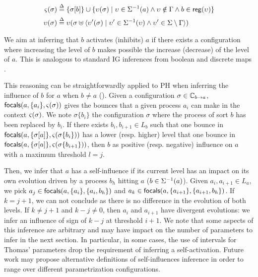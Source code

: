 \begin{align}
\varsigma(\sigma) & \stackrel{\Delta}= \{ \sigma[b] \} \cup \{ \upsilon(\sigma) \mid
\upsilon\in\Sigma^{-1}(a) \wedge  \upsilon \notin\Gamma \wedge b\in \mathsf{reg}({\upsilon}) \}
\label{eq:ctx-sigma}
\\
\upsilon(\sigma) & \stackrel{\Delta}=
\upsilon(\sigma \uplus \langle \upsilon'(\sigma) \mid 
	\upsilon'\in\Sigma^{-1}(\upsilon) \wedge
	\upsilon'\in\Sigma\setminus\Gamma  \rangle)
\label{eq:cooperative-eval}
\end{align}

We aim at inferring that $b$ activates (inhibits) $a$ if there exists a configuration where increasing
the level of $b$ makes possible the increase (decrease) of the level of $a$.
This is analogous to standard IG inferences from boolean and discrete maps 
\cite{RiCo07}.

This reasoning can be straightforwardly applied to PH when inferring the influence of $b$ for $a$ when
$b\neq a$ ().
Given a configuration $\sigma\in\mathbb C_{b\rightarrow a}$, 
$\mathsf{focals}(a,\{a_i\},\varsigma(\sigma))$ gives the bounces that a given process $a_i$ can make in the
context $\varsigma(\sigma)$.
We note $\sigma\{b_i\}$ the configuration $\sigma$ where the process of sort $b$ has been replaced
by $b_i$.
If there exists $b_i,b_{i+1}\in L_b$ such that one bounce in 
$\mathsf{focals}(a, \{\sigma[a]\}, \varsigma(\sigma\{b_i\}))$
has a lower (resp. higher) level that one bounce in
$\mathsf{focals}(a, \{\sigma[a]\}, \varsigma(\sigma\{b_{i+1}\}))$, then
$b$ as positive (resp. negative) influence on $a$ with a maximum threshold $l=j$.

Then, we infer that $a$ has a self-influence if its current level has an impact on its own evolution
driven by a process $b_h$ hitting $a$ ($b\in\Sigma^{-1}(a)$).
Given $a_i,a_{i+1}\in L_a$, we pick $a_j\in\mathsf{focals}(a,\{a_i\},\{a_i,b_h\})$ and
$a_k\in\mathsf{focals}(a,\{a_{i+1}\},\{a_{i+1},b_h\})$.
If $k=j+1$, we can not conclude as there is no difference in the evolution of both levels.
If $k\neq j+1$ and $k-j\neq 0$, then $a_i$ and $a_{i+1}$ have divergent evolutions: we infer an
influence of sign of $k-j$ at threshold $i+1$.
We note that some aspects of this inference are arbitrary and may have impact on the number of
parameters to infer in the next section.
In particular, in some cases, the use of intervals for Thomas' parameters drop the requirement of
inferring a self-activation.
Future work may propose alternative definitions of self-influences inference in order to range over
different parametrization configurations.

